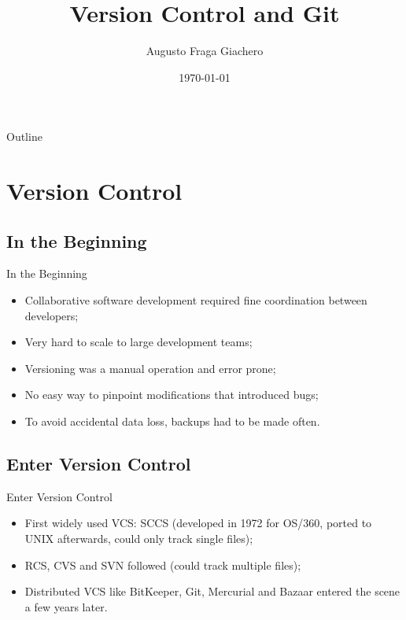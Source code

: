 \documentclass{beamer}
\title{Version Control and Git}
\author{Augusto Fraga Giachero}
\date{\today}
\begin{document}
\begin{frame}
  \titlepage 
\end{frame}

\begin{frame}{Outline}
  \tableofcontents
\end{frame}

\section{Version Control}

\subsection{In the Beginning}
\begin{frame}{In the Beginning}
  \begin{itemize}
    \item Collaborative software development required fine coordination between developers;
    \item Very hard to scale to large development teams;
    \item Versioning was a manual operation and error prone;
    \item No easy way to pinpoint modifications that introduced bugs;
    \item To avoid accidental data loss, backups had to be made often.
  \end{itemize}
\end{frame}

\subsection{Enter Version Control}
\begin{frame}{Enter Version Control}
  \begin{itemize}
    \item First widely used VCS: SCCS (developed in 1972 for OS/360, ported to UNIX afterwards, could only track single files);
    \item RCS, CVS and SVN followed (could track multiple files);
    \item Distributed VCS like BitKeeper, Git, Mercurial and Bazaar entered the scene a few years later.
  \end{itemize}
\end{frame}
\end{document}
